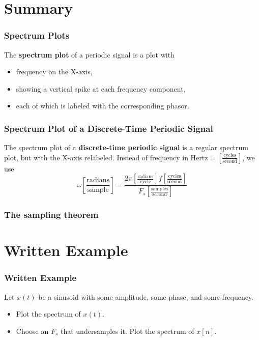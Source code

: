 \documentclass{beamer}
\begin{document}
\section[Summary]{Summary}
\setcounter{subsection}{1}

\begin{frame}
  \frametitle{Spectrum Plots}

  The {\bf spectrum plot} of a periodic signal is a plot with
  \begin{itemize}
  \item frequency on the X-axis,
  \item showing a vertical spike at each frequency component,
  \item each of which is labeled with the corresponding phasor.
  \end{itemize}
\end{frame}

\begin{frame}
  \frametitle{Spectrum Plot of a Discrete-Time Periodic Signal}

  The spectrum plot of a {\bf discrete-time periodic signal} is a
  regular spectrum plot, but with the X-axis relabeled.  Instead of
  frequency in Hertz$=\left[\frac{\mbox{cycles}}{\mbox{second}}\right]$, we use
    \begin{displaymath}
      \omega \left[\frac{\mbox{radians}}{\mbox{sample}}\right] =
      \frac{2\pi \left[\frac{\mbox{radians}}{\mbox{cycle}}\right]f\left[\frac{\mbox{cycles}}{\mbox{second}}\right]}{F_s\left[\frac{\mbox{samples}}{\mbox{second}}\right]}
    \end{displaymath}
\end{frame}

\begin{frame}
  \frametitle{The sampling theorem}

\end{frame}

\section[Example]{Written Example}
\setcounter{subsection}{1}

\begin{frame}
  \frametitle{Written Example}

  Let $x(t)$ be a sinusoid with some amplitude, some phase, and some frequency.
  \begin{itemize}
  \item Plot the spectrum of $x(t)$.
  \item Choose an $F_s$ that undersamples it.  Plot the spectrum of $x[n]$.
  \end{itemize}
\end{frame}
\end{document}
